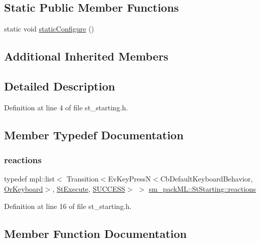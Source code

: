\subsection*{Static Public Member Functions}
\begin{DoxyCompactItemize}
\item 
static void \hyperlink{structsm__packML_1_1StStarting_a027b510edb3a7fc5bc344ad9b7917f79}{static\+Configure} ()
\end{DoxyCompactItemize}
\subsection*{Additional Inherited Members}


\subsection{Detailed Description}


Definition at line 4 of file st\+\_\+starting.\+h.



\subsection{Member Typedef Documentation}
\mbox{\label{structsm__packML_1_1StStarting_a904cf3eb697547a33964bcdabea0ae2e}} 
\subsubsection{\texorpdfstring{reactions}{reactions}}
{\footnotesize\ttfamily typedef mpl\+::list$<$ Transition$<$Ev\+Key\+PressN$<$Cb\+Default\+Keyboard\+Behavior, \hyperlink{classsm__packML_1_1OrKeyboard}{Or\+Keyboard}$>$, \hyperlink{structsm__packML_1_1StExecute}{St\+Execute}, \hyperlink{classSUCCESS}{S\+U\+C\+C\+E\+SS}$>$ $>$ \hyperlink{structsm__packML_1_1StStarting_a904cf3eb697547a33964bcdabea0ae2e}{sm\+\_\+pack\+M\+L\+::\+St\+Starting\+::reactions}}



Definition at line 16 of file st\+\_\+starting.\+h.



\subsection{Member Function Documentation}
\mbox{\label{structsm__packML_1_1StStarting_a5fa3513fd8240842dbad5d1c0c101949}} 
